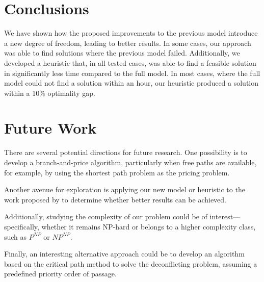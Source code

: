 \documentclass[../../thesis.tex]{subfiles}
\begin{document}
\section{Conclusions}  
We have shown how the proposed improvements to the previous model introduce a new degree of freedom, leading to better results. In some cases, our approach was able to find solutions where the previous model failed. Additionally, we developed a heuristic that, in all tested cases, was able to find a feasible solution in significantly less time compared to the full model. In most cases, where the full model could not find a solution within an hour, our heuristic produced a solution within a 10\% optimality gap.  

\section{Future Work}  
There are several potential directions for future research. One possibility is to develop a branch-and-price algorithm, particularly when free paths are available, for example, by using the shortest path problem as the pricing problem.  

Another avenue for exploration is applying our new model or heuristic to the work proposed by \cite{portoleau-2024} to determine whether better results can be achieved.  

Additionally, studying the complexity of our problem could be of interest—specifically, whether it remains NP-hard or belongs to a higher complexity class, such as $P^{NP}$ or $NP^{NP}$.  

Finally, an interesting alternative approach could be to develop an algorithm based on the critical path method to solve the deconflicting problem, assuming a predefined priority order of passage.  
\end{document}

